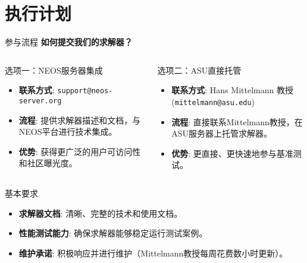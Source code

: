 \documentclass[10pt]{beamer}
\begin{document}
\section{执行计划}

\begin{frame}{参与流程}
  \textbf{如何提交我们的求解器？}
  \begin{columns}[T,onlytextwidth]
      \begin{block}{选项一：NEOS服务器集成}
        \begin{itemize}
          \item \textbf{联系方式}: \texttt{support@neos-server.org}
          \item \textbf{流程}: 提供求解器描述和文档，与NEOS平台进行技术集成。
          \item \textbf{优势}: 获得更广泛的用户可访问性和社区曝光度。
        \end{itemize}
      \end{block}
      \begin{block}{选项二：ASU直接托管}
        \begin{itemize}
          \item \textbf{联系方式}: Hans Mittelmann 教授 (\texttt{mittelmann@asu.edu})
          \item \textbf{流程}: 直接联系Mittelmann教授，在ASU服务器上托管求解器。
          \item \textbf{优势}: 更直接、更快速地参与基准测试。
        \end{itemize}
      \end{block}
  \end{columns}
  
  \begin{exampleblock}{基本要求}
    \begin{itemize}
      \item \textbf{求解器文档}: 清晰、完整的技术和使用文档。
      \item \textbf{性能测试能力}: 确保求解器能够稳定运行测试案例。
      \item \textbf{维护承诺}: 积极响应并进行维护（Mittelmann教授每周花费数小时更新）。
    \end{itemize}
  \end{exampleblock}
\end{frame}
\end{document}
